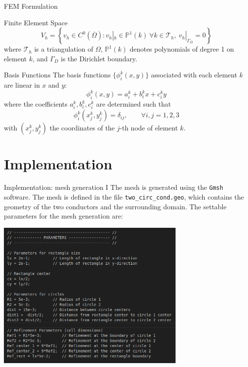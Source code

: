 \documentclass[aspectratio=54,xcolor=dvipsnames]{beamer}
\begin{document}
\begin{frame}{FEM Formulation}
    \begin{block}{Finite Element Space}
    \[
    V_h = \left\{ v_h \in C^0(\overline{\Omega}) : v_h|_k \in \mathbb{P}^1(k)\ \forall k \in \mathcal{T}_h,\ v_h|_{\Gamma_D} = 0 \right\}
    \]
    where $\mathcal{T}_h$ is a triangulation of $\Omega$, $\mathbb{P}^1(k)$ denotes polynomials of degree 1 on element $k$, and $\Gamma_D$ is the Dirichlet boundary.
    \end{block}
    \begin{block}{Basis Functions}
    The basis functions $\{\phi_i^k(x, y)\}$ associated with each element $k$ are linear in $x$ and $y$:
    \[
    \phi_i^k(x, y) = a_i^k + b_i^k x + c_i^k y
    \]
    where the coefficients $a_i^k, b_i^k, c_i^k$ are determined such that
    \[
    \phi_i^k(x_j^k, y_j^k) = \delta_{ij}, \qquad \forall i, j = 1,2,3
    \]
    with $(x_j^k, y_j^k)$ the coordinates of the $j$-th node of element $k$.
    \end{block}
    
\end{frame}

\section{Implementation}
\begin{frame}{Implementation: mesh generation I}
    The mesh is generated using the \texttt{Gmsh} software. The mesh is defined in the file \texttt{two\_circ\_cond.geo}, which contains the geometry of the two conductors and the surrounding domain. The settable parameters for the mesh generation are:
    \begin{center}
         \includegraphics[width=0.7\textwidth]{Images/Gmsh_parameters.png}
    \end{center}
\end{frame}
\end{document}
